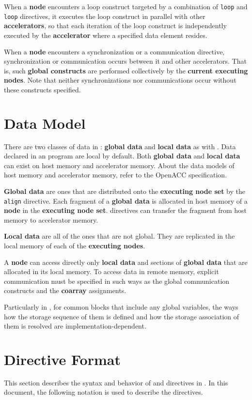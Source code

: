 When a {\bf node} encounters a loop construct 
targeted by a combination of {\XMP} {\tt loop} and {\OACC} {\tt loop} directives,
it executes the loop construct in parallel with other {\bf accelerators},
so that each iteration of the loop construct is independently executed by the {\bf accelerator}
where a specified data element resides.

When a {\bf node} encounters a {\XACC} synchronization or a {\XACC} communication directive,
synchronization or communication occurs between it and other accelerators.
That is, such {\bf global constructs} are performed collectively by the {\bf current executing nodes}.
Note that neither synchronizations nor communications occur without these constructs specified.

\section{Data Model}
There are two classes of data in {\XACC}: {\bf global data} and {\bf local data} as with {\XMP}. 
Data declared in an {\XACC} program are local by default.
Both {\bf global data} and {\bf local data} can exist on host memory and accelerator memory.
About the data models of host memory and accelerator memory, refer to the OpenACC specification\cite{openacc}.

{\bf Global data} are ones that are distributed onto the {\bf executing node set} by the {\tt align} directive.
Each fragment of a {\bf global data} is allocated in host memory of a {\bf node} in the {\bf executing node set}.
{\OACC} directives can transfer the fragment from host memory to accelerator memory.

{\bf Local data} are all of the ones that are not global.
They are replicated in the local memory of each of the {\bf executing nodes}.

A {\bf node} can access directly only {\bf local data} and sections of {\bf global data} that are allocated in its local memory.
To access data in remote memory, 
explicit communication must be specified in such ways as the global communication constructs and the {\bf coarray} assignments.

Particularly in {\XACCF}, 
for common blocks that include any global variables, 
the ways how the storage sequence of them is defined and how the storage association of them is resolved are implementation-dependent.

\section{Directive Format}
This section describes the syntax and behavior of {\XMP} and {\OACC} directives in {\XACC}.
In this document, 
the following notation is used to describe the directives.

